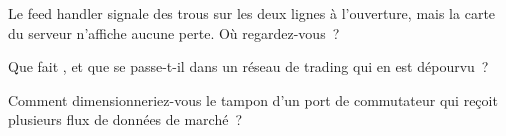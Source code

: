 \begin{interviewq}\label{iq:nw:networking-for-trading:4}
Le feed handler signale des trous sur les deux lignes à l'ouverture, mais la carte du serveur n'affiche aucune perte. Où regardez-vous~?
\end{interviewq}

\begin{interviewq}\label{iq:nw:networking-for-trading:5}
Que fait , et que se passe-t-il dans un réseau de trading qui en est dépourvu~?
\end{interviewq}

\begin{interviewq}\label{iq:nw:networking-for-trading:6}
Comment dimensionneriez-vous le tampon d'un port de commutateur qui reçoit plusieurs flux de données de marché~?
\end{interviewq}
